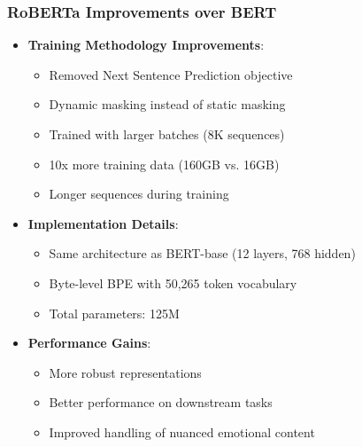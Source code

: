 \documentclass{beamer}
\begin{document}
\begin{frame}
\frametitle{RoBERTa Improvements over BERT}
\begin{itemize}
    \item \textbf{Training Methodology Improvements}:
    \begin{itemize}
        \item Removed Next Sentence Prediction objective
        \item Dynamic masking instead of static masking
        \item Trained with larger batches (8K sequences)
        \item 10x more training data (160GB vs. 16GB)
        \item Longer sequences during training
    \end{itemize}
    \item \textbf{Implementation Details}:
    \begin{itemize}
        \item Same architecture as BERT-base (12 layers, 768 hidden)
        \item Byte-level BPE with 50,265 token vocabulary
        \item Total parameters: 125M
    \end{itemize}
    \item \textbf{Performance Gains}:
    \begin{itemize}
        \item More robust representations
        \item Better performance on downstream tasks
        \item Improved handling of nuanced emotional content
    \end{itemize}
\end{itemize}
\end{frame}
\end{document}
